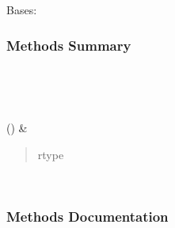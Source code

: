 \documentclass[letterpaper,10pt,english]{sphinxmanual}
\begin{document}
\begin{fulllineitems}
\label{\detokenize{api/seyfert.cosmology.weight_functions.VoidWeightFunction:seyfert.cosmology.weight_functions.VoidWeightFunction}}
\sphinxAtStartPar
Bases: {\hyperref[\detokenize{api/seyfert.cosmology.weight_functions.WeightFunctionWithBias:seyfert.cosmology.weight_functions.WeightFunctionWithBias}]{}}
\subsubsection*{Methods Summary}


\begin{savenotes}\sphinxatlongtablestart\begin{longtable}[c]{}
\hline

\endfirsthead

%
{}\\
\hline

\endhead

\hline
{}\\
\endfoot

\endlastfoot

\sphinxAtStartPar
{\hyperref[\detokenize{api/seyfert.cosmology.weight_functions.VoidWeightFunction:seyfert.cosmology.weight_functions.VoidWeightFunction.setupBias}]{}}()
&
\sphinxAtStartPar
\begin{quote}\begin{description}
\item[{rtype}] \leavevmode
\sphinxAtStartPar
{}

\end{description}\end{quote}

\\
\hline
\end{longtable}\sphinxatlongtableend\end{savenotes}
\subsubsection*{Methods Documentation}


\end{fulllineitems}
\end{document}
